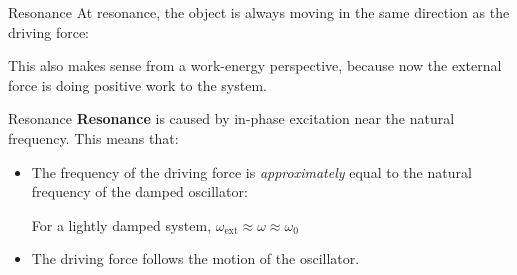 \documentclass[12pt,compress,aspectratio=169]{beamer}
\begin{document}
\begin{frame}{Resonance}
  At resonance, the object is always moving in the same direction as the
  driving force:


  This also makes sense from a work-energy perspective, because now the
  external force is doing positive work to the system.
\end{frame}



\begin{frame}{Resonance}
  \textbf{Resonance} is caused by in-phase excitation near the natural
  frequency. This means that:
  \begin{itemize}
  \item The frequency of the driving force is \emph{approximately} equal to the
    natural frequency of the damped oscillator:


    For a lightly damped system, $\omega_\text{ext}\approx\omega\approx\omega_0$
  \item The driving force follows the motion of the oscillator.
  \end{itemize}
\end{frame}
\end{document}
